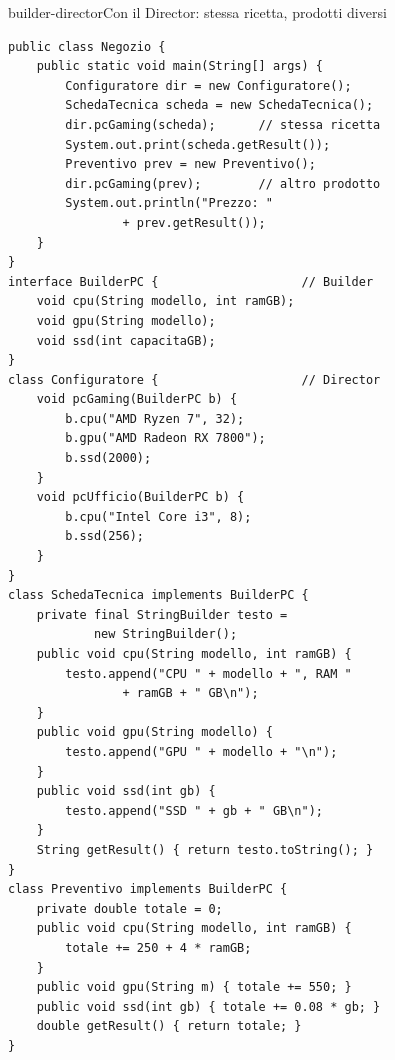 \begin{programma}{builder-director}{Con il Director: stessa ricetta, prodotti diversi}
\begin{lstlisting}[style=javacs, name=Negozio.java]
public class Negozio {
    public static void main(String[] args) {
        Configuratore dir = new Configuratore();
        SchedaTecnica scheda = new SchedaTecnica();
        dir.pcGaming(scheda);      // stessa ricetta
        System.out.print(scheda.getResult());
        Preventivo prev = new Preventivo();
        dir.pcGaming(prev);        // altro prodotto
        System.out.println("Prezzo: "
                + prev.getResult());
    }
}
interface BuilderPC {                    // Builder
    void cpu(String modello, int ramGB);
    void gpu(String modello);
    void ssd(int capacitaGB);
}
class Configuratore {                    // Director
    void pcGaming(BuilderPC b) {
        b.cpu("AMD Ryzen 7", 32);
        b.gpu("AMD Radeon RX 7800");
        b.ssd(2000);
    }
    void pcUfficio(BuilderPC b) {
        b.cpu("Intel Core i3", 8);
        b.ssd(256);
    }
}
class SchedaTecnica implements BuilderPC {
    private final StringBuilder testo =
            new StringBuilder();
    public void cpu(String modello, int ramGB) {
        testo.append("CPU " + modello + ", RAM "
                + ramGB + " GB\n");
    }
    public void gpu(String modello) {
        testo.append("GPU " + modello + "\n");
    }
    public void ssd(int gb) {
        testo.append("SSD " + gb + " GB\n");
    }
    String getResult() { return testo.toString(); }
}
class Preventivo implements BuilderPC {
    private double totale = 0;
    public void cpu(String modello, int ramGB) {
        totale += 250 + 4 * ramGB;
    }
    public void gpu(String m) { totale += 550; }
    public void ssd(int gb) { totale += 0.08 * gb; }
    double getResult() { return totale; }
}
\end{lstlisting}
\tcblower
{}


\end{programma}
